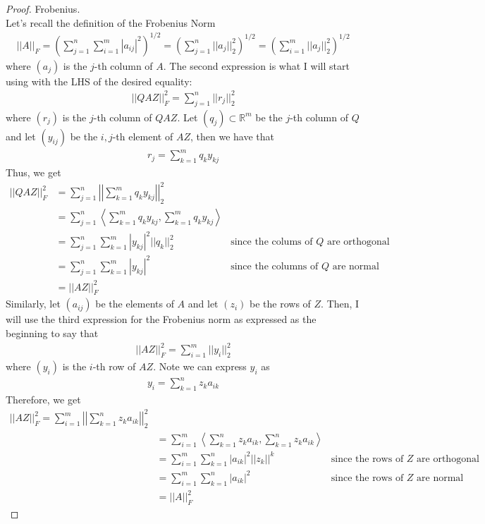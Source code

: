 \documentclass[10pt,a4paper]{article}
\theoremstyle{definition}
\theoremstyle{definition}
\numberwithin{equation}{section}
\begin{document}
\begin{proof} Frobenius.
\\Let's recall the definition of the Frobenius Norm
\begin{align*}
||A||_F = \left( \sum_{j = 1}^n \sum_{i = 1}^m |a_{ij}|^2 \right)^{1/2} = \left( \sum_{j = 1}^n ||a_j||_2^2 \right)^{1/2} = \left( \sum_{i = 1}^m ||a_j||_2^2 \right)^{1/2}
\end{align*}
where $(a_j)$ is the $j$-th column of $A$. The second expression is what I will start using with the LHS of the desired equality:
\begin{align*}
||QAZ||_F^2 = \sum_{j = 1}^n ||r_j||_2^2
\end{align*}
where $(r_j)$ is the $j$-th column of $QAZ$. Let $(q_j) \subset \mathbb{R}^m$ be the $j$-th column of $Q$ and let $(y_{ij})$ be the $i,j$-th element of $AZ$, then we have that 
\begin{align*}
r_j = \sum_{k = 1}^m q_k y_{kj}
\end{align*}
Thus, we get
\begin{align*}
||QAZ||_F^2 &= \sum_{j = 1}^n \left| \left| \sum_{k = 1}^m q_k y_{kj} \right| \right|_2^2\\
&= \sum_{j = 1}^n \left\langle \sum_{k = 1}^m q_k y_{kj}, \sum_{k = 1}^m q_k y_{kj} \right \rangle\\
&= \sum_{j = 1}^n \sum_{k = 1}^m |y_{kj}|^2 ||q_k||_2^2 &\text{since the colums of $Q$ are orthogonal}\\
&= \sum_{j = 1}^n \sum_{k = 1}^m |y_{kj}|^2 &\text{since the columns of $Q$ are normal}\\
&= ||AZ||_F^2
\end{align*}
Similarly, let $(a_{ij})$ be the elements of $A$ and let $(z_i)$ be the rows of $Z$. Then, I will use the third expression for the Frobenius norm as expressed as the beginning to say that 
\begin{align*}
||AZ||_F^2 = \sum_{i = 1}^m ||y_i||_2^2
\end{align*}
where $(y_i)$ is the $i$-th row of $AZ$. Note we can express $y_i$ as 
\begin{align*}
y_i = \sum_{k = 1}^n z_k a_{ik}
\end{align*}
Therefore, we get
\begin{align*}
||AZ||_F^2 = \sum_{i = 1}^m \left| \left| \sum_{k = 1}^n z_k a_{ik} \right| \right|_2^2\\
&= \sum_{i = 1}^m \left \langle \sum_{k = 1}^n z_k a_{ik}, \sum_{k = 1}^n z_k a_{ik} \right \rangle\\
&= \sum_{i = 1}^m \sum_{k = 1}^n |a_{ik}|^2 ||z_k||^k &\text{since the rows of $Z$ are orthogonal}\\
&= \sum_{i = 1}^m \sum_{k = 1}^n |a_{ik}|^2 &\text{since the rows of $Z$ are normal}\\
&= ||A||_F^2
\end{align*}
\end{proof}
\end{document}
